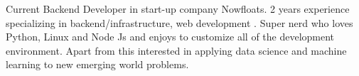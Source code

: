 

\begin{cvparagraph}

Current Backend Developer in start-up company Nowfloats. 2 years experience specializing in backend/infrastructure, web development . Super nerd who loves Python, Linux and Node Js and enjoys to customize all of the development environment. Apart from this interested in applying data science and machine learning to new emerging world problems. 
\end{cvparagraph}
